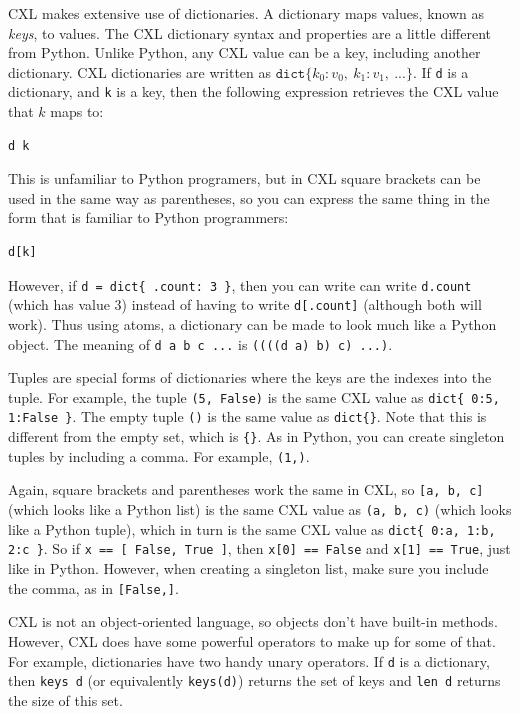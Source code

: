 \documentclass{report}
\newenvironment{code}{
\tcolorbox
}{
\endtcolorbox
}
\begin{document}
CXL makes extensive use of dictionaries.
A dictionary maps values, known as \emph{keys}, to values.
The CXL dictionary syntax and properties are a little different from Python.
Unlike Python, any CXL value can be a key, including another
dictionary.
CXL dictionaries are written as
$\mathtt{dict}\{ k_0: v_0, ~ k_1: v_1, ~ ... \}$.
If \texttt{d} is a dictionary, and \texttt{k} is a key, then the
following expression retrieves the CXL value that $k$ maps to:
\begin{code}
\begin{verbatim}
d k
\end{verbatim}
\end{code}
This is unfamiliar to Python programers, but in CXL square brackets can be used
in the same way as parentheses, so you can express the same thing in the form
that is familiar to Python programmers:
\begin{code}
\begin{verbatim}
d[k]
\end{verbatim}
\end{code}
However, if \texttt{d = dict\{ .count: 3 \}}, then you can write
can write \texttt{d.count} (which has value 3) instead of having to write
\texttt{d[.count]} (although both will work).
Thus using atoms, a dictionary can be made to look much like a Python object.
The meaning of \texttt{d a b c ...} is \texttt{((((d a) b) c) ...)}.

Tuples are special forms of dictionaries where the keys are
the indexes into the tuple.  For example, the tuple
\texttt{(5, False)} is the same CXL value as
\texttt{dict\{ 0:5, 1:False \}}.
The empty tuple \texttt{()} is the same value as \texttt{dict\{\}}.
Note that this is different from the empty set, which is \texttt{\{\}}.
As in Python, you can create singleton tuples by including a comma.
For example, \texttt{(1,)}.

Again, square brackets and parentheses work the same in CXL, so
\texttt{[a, b, c]} (which looks like a Python list)
is the same CXL value as \texttt{(a, b, c)} (which looks like a Python tuple),
which in turn is the same CXL value as \texttt{dict\{ 0:a, 1:b, 2:c \}}.
So if \texttt{x == [ False, True ]},
then \texttt{x[0] == False} and \texttt{x[1] == True}, just like in Python.
However, when creating a singleton list, make sure you include the
comma, as in \texttt{[False,]}.

CXL is not an object-oriented language, so objects don't have
built-in methods.  However, CXL does have some powerful operators to
make up for some of that.
For example, dictionaries have two handy unary operators.
If \texttt{d} is a
dictionary, then \texttt{keys~d} (or equivalently \texttt{keys(d)})
returns the set of keys and \texttt{len~d} returns the size of
this set.
\end{document}
